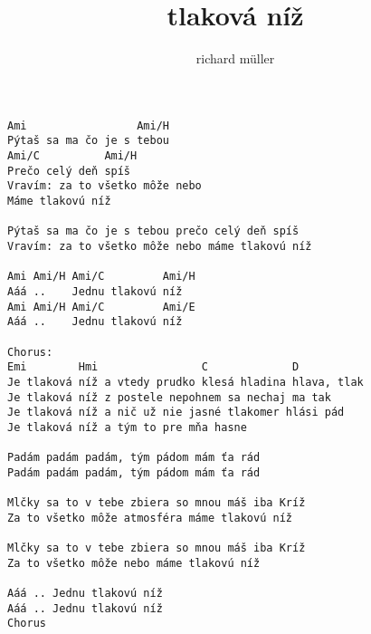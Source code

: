 \author{richard m\"uller}
\title{tlaková níž}
\maketitle
\begin{verbatim}
Ami                 Ami/H
Pýtaš sa ma čo je s tebou
Ami/C          Ami/H
Prečo celý deň spíš
Vravím: za to všetko môže nebo
Máme tlakovú níž

Pýtaš sa ma čo je s tebou prečo celý deň spíš
Vravím: za to všetko môže nebo máme tlakovú níž

Ami Ami/H Ami/C         Ami/H
Aáá ..    Jednu tlakovú níž
Ami Ami/H Ami/C         Ami/E
Aáá ..    Jednu tlakovú níž

Chorus:
Emi        Hmi                C             D
Je tlaková níž a vtedy prudko klesá hladina hlava, tlak
Je tlaková níž z postele nepohnem sa nechaj ma tak
Je tlaková níž a nič už nie jasné tlakomer hlási pád
Je tlaková níž a tým to pre mňa hasne

Padám padám padám, tým pádom mám ťa rád
Padám padám padám, tým pádom mám ťa rád

Mlčky sa to v tebe zbiera so mnou máš iba Kríž
Za to všetko môže atmosféra máme tlakovú níž

Mlčky sa to v tebe zbiera so mnou máš iba Kríž
Za to všetko môže nebo máme tlakovú níž

Aáá .. Jednu tlakovú níž
Aáá .. Jednu tlakovú níž
Chorus
\end{verbatim}